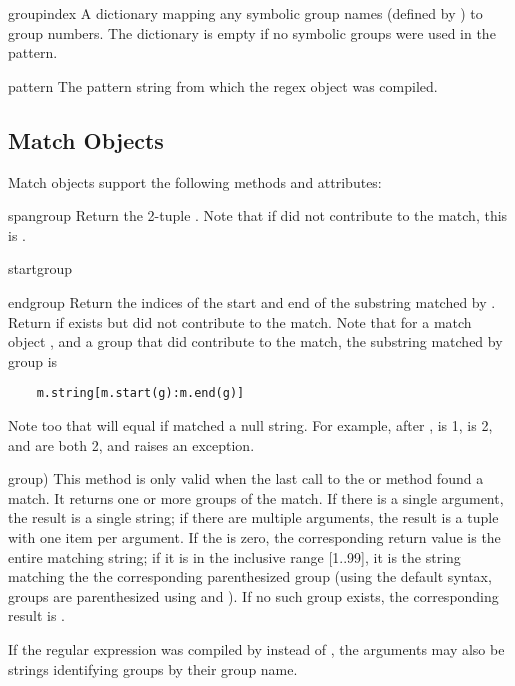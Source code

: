 \begin{datadesc}{groupindex}
A dictionary mapping any symbolic group names (defined by 
) to group numbers.  The dictionary is empty if no
symbolic groups were used in the pattern.
\end{datadesc}

\begin{datadesc}{pattern}
The pattern string from which the regex object was compiled.
\end{datadesc}

\subsection{Match Objects}
Match objects support the following methods and attributes:

\begin{funcdesc}{span}{group}
Return the 2-tuple .
Note that if  did not contribute to the match, this is .
\end{funcdesc}

\begin{funcdesc}{start}{group}
\end{funcdesc}

\begin{funcdesc}{end}{group}
Return the indices of the start and end of the substring matched by
.  Return  if  exists but did not contribute to
the match.  Note that for a match object , and a group 
that did contribute to the match, the substring matched by group  is
\bcode\begin{verbatim}
    m.string[m.start(g):m.end(g)]
\end{verbatim}\ecode
%
Note too that  will equal
 if  matched a null string.  For example,
after ,  is 1,
 is 2,  and  are both
2, and  raises an 
 exception.
\end{funcdesc}

\begin{funcdesc}{group}{)}
This method is only valid when the last call to the 
or  method found a match.  It returns one or more
groups of the match.  If there is a single  argument,
the result is a single string; if there are multiple arguments, the
result is a tuple with one item per argument.  If the  is
zero, the corresponding return value is the entire matching string; if
it is in the inclusive range [1..99], it is the string matching the
the corresponding parenthesized group (using the default syntax,
groups are parenthesized using \code{\e (} and \code{\e )}).  If no
such group exists, the corresponding result is .

If the regular expression was compiled by  instead of
, the  arguments may also be strings
identifying groups by their group name.
\end{funcdesc}

